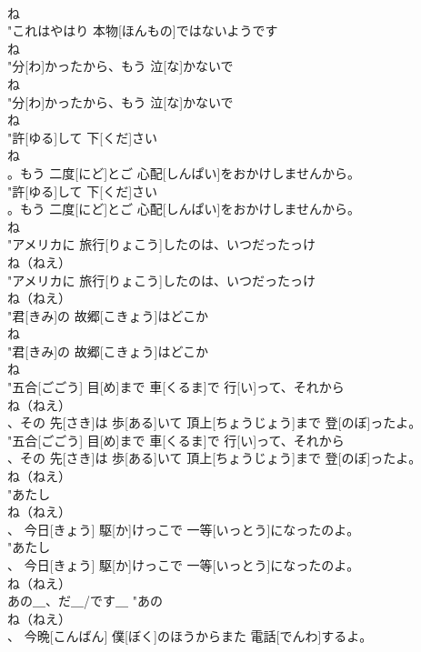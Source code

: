 \documentclass[8pt]{extreport}
\begin{document}
\begin{CJK}{UTF8}{min}
\\	ね
\\	"これはやはり 本物[ほんもの]ではないようです
\\	ね
\\	"分[わ]かったから、もう 泣[な]かないで
\\	ね
\\	"分[わ]かったから、もう 泣[な]かないで
\\	ね
\\	"許[ゆる]して 下[くだ]さい
\\	ね
\\	。もう 二度[にど]とご 心配[しんぱい]をおかけしませんから。
\\	"許[ゆる]して 下[くだ]さい
\\	。もう 二度[にど]とご 心配[しんぱい]をおかけしませんから。
\\	ね
\\	"アメリカに 旅行[りょこう]したのは、いつだったっけ
\\	ね（ねえ）
\\	"アメリカに 旅行[りょこう]したのは、いつだったっけ
\\	ね（ねえ）
\\	"君[きみ]の 故郷[こきょう]はどこか
\\	ね
\\	"君[きみ]の 故郷[こきょう]はどこか
\\	ね
\\	"五合[ごごう] 目[め]まで 車[くるま]で 行[い]って、それから
\\	ね（ねえ）
\\	、その 先[さき]は 歩[ある]いて 頂上[ちょうじょう]まで 登[のぼ]ったよ。
\\	"五合[ごごう] 目[め]まで 車[くるま]で 行[い]って、それから
\\	、その 先[さき]は 歩[ある]いて 頂上[ちょうじょう]まで 登[のぼ]ったよ。
\\	ね（ねえ）
\\	"あたし
\\	ね（ねえ）
\\	、 今日[きょう] 駆[か]けっこで 一等[いっとう]になったのよ。
\\	"あたし
\\	、 今日[きょう] 駆[か]けっこで 一等[いっとう]になったのよ。
\\	ね（ねえ）
\\	あの＿、だ＿/です＿	"あの
\\	ね（ねえ）
\\	、 今晩[こんばん] 僕[ぼく]のほうからまた 電話[でんわ]するよ。

\end{CJK}
\end{document}
